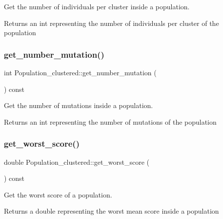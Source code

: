 Get the number of individuals per cluster inside a population. 

\begin{DoxyReturn}{Returns}
an int representing the number of individuals per cluster of the population 
\end{DoxyReturn}
\mbox{\label{class_population__clustered_a0593be0ca86a2cc3497ba26ffecac82c}} 
\subsubsection{\texorpdfstring{get\+\_\+number\+\_\+mutation()}{get\_number\_mutation()}}
{\footnotesize\ttfamily int Population\+\_\+clustered\+::get\+\_\+number\+\_\+mutation (\begin{DoxyParamCaption}{ }\end{DoxyParamCaption}) const}



Get the number of mutations inside a population. 

\begin{DoxyReturn}{Returns}
an int representing the number of mutations of the population 
\end{DoxyReturn}
\mbox{\label{class_population__clustered_a62cf77b998887914248633a29a432e81}} 
\subsubsection{\texorpdfstring{get\+\_\+worst\+\_\+score()}{get\_worst\_score()}}
{\footnotesize\ttfamily double Population\+\_\+clustered\+::get\+\_\+worst\+\_\+score (\begin{DoxyParamCaption}{ }\end{DoxyParamCaption}) const}



Get the worst score of a population. 

\begin{DoxyReturn}{Returns}
a double representing the worst mean score inside a population 
\end{DoxyReturn}
\mbox{\label{class_population__clustered_aa7600f7b8134b9371b593a00a7d67086}} 

